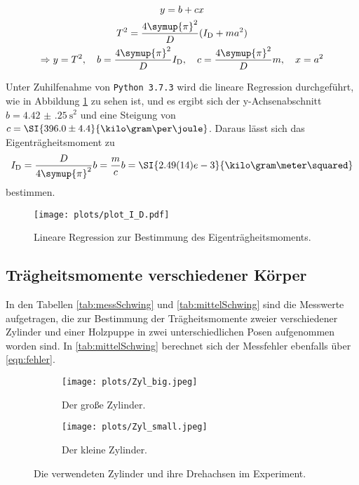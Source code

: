 \begin{gather}
y=b+cx \\
T^2 = \frac{4\symup{\pi}^2}{D}(I_\text{D}+ma^2) \\
\Rightarrow y = T^2, 
\quad b =  \frac{4\symup{\pi}^2}{D} I_\text{D}, 
\quad c = \frac{4\symup{\pi}^2}{D}m ,
\quad x = a^2 
\end{gather}

Unter Zuhilfenahme von \texttt{Python 3.7.3} wird die lineare Regression durchgeführt, wie in Abbildung \ref{fig:Thoch2} zu sehen ist, und es ergibt sich der y-Achsenabschnitt~${b=\SI{4.42(25)}{\second\squared}}$
und eine Steigung von ${c=\SI{396.0\pm4.4}{\kilo\gram\per\joule}}$. 
Daraus lässt sich das Eigenträgheitsmoment zu 
\begin{equation}
    I_\text{D}=\frac{D}{4\symup{\pi}^2}b=\frac{m}{c}b=\SI{2.49(14)e-3}{\kilo\gram\meter\squared}
\end{equation}
bestimmen.

\begin{figure}
    \centering
    \texttt{[image: plots/plot\_I\_D.pdf]}
    \caption{Lineare Regression zur Bestimmung des Eigenträgheitsmoments.}
    \label{fig:Thoch2}
\end{figure}

\FloatBarrier
\subsection{Trägheitsmomente verschiedener Körper}

In den Tabellen \ref{tab:messSchwing} und \ref{tab:mittelSchwing} sind die Messwerte aufgetragen, die zur Bestimmung der 
Trägheitsmomente zweier verschiedener Zylinder und einer Holzpuppe in zwei unterschiedlichen Posen aufgenommen worden sind. 
In \ref{tab:mittelSchwing} berechnet sich der Messfehler ebenfalls über \eqref{eqn:fehler}. 

\begin{figure}
    \centering
    \begin{subfigure}{0.48\textwidth}
        \centering
        \texttt{[image: plots/Zyl\_big.jpeg]}
        \caption{Der große Zylinder.}
        \label{fig:grZyl}
    \end{subfigure}
    \begin{subfigure}{0.48\textwidth}
        \centering
        \texttt{[image: plots/Zyl\_small.jpeg]}
        \caption{Der kleine Zylinder.}
        \label{fig:klZyl}
    \end{subfigure}
    \caption{Die verwendeten Zylinder und ihre Drehachsen im Experiment.}
    \label{fig:Zyl}
\end{figure}

